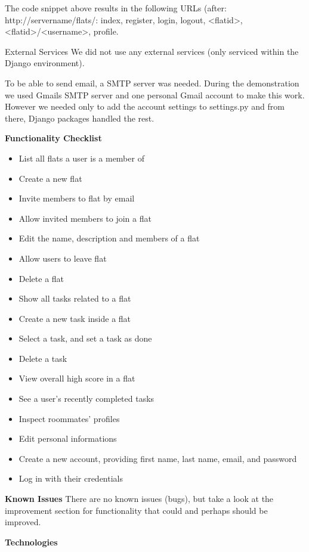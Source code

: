\documentclass{sig-alt-release2}
\begin{document}
The code snippet above results in the following URLs (after:
http://servername/flats/: index, register, login, logout, <flatid>,
<flatid>/<username>, profile.

External Services We did not use any external services (only serviced within the
Django environment).

To be able to send email, a SMTP server was needed. During the demonstration we
used Gmails SMTP server and one personal Gmail account to make this work.
However we needed only to add the account settings to settings.py and from
there, Django packages handled the rest.


\textbf{Functionality Checklist}
\begin{itemize}
\item List all flats a user is a member of
\item Create a new flat
\item Invite members to flat by email
\item Allow invited members to join a flat 
\item Edit the name, description and members of a flat
\item Allow users to leave flat
\item Delete a flat
\item Show all tasks related to a flat
\item Create a new task inside a flat
\item Select a task, and set a task as done
\item Delete a task
\item View overall high score in a flat
\item See a user's recently completed tasks
\item Inspect roommates' profiles
\item Edit personal informations
\item Create a new account, providing first name, last name, email, and password
\item Log in with their credentials
\end{itemize}

\textbf{Known Issues} There are no known issues (bugs), but take a look at the
improvement section for functionality that could and perhaps should be improved.

\textbf{Technologies}
\end{document}
